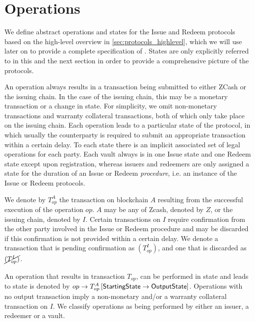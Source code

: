 \section{Operations}
\label{sec:ops}

We define abstract operations and states for the Issue and Redeem protocols based on the high-level overview in \cref{sec:protocols_highlevel}, which we will use later on to provide a complete specification of \zclaim.
States are only explicitly referred to in this and the next section in order to provide a comprehensive picture of the protocols.

An operation always results in a transaction being submitted to either ZCash or the issuing chain.
In the case of the issuing chain, this may be a monetary transaction or a change in state.
For simplicity, we omit non-monetary transactions and warranty collateral transactions, both of which only take place on the issuing chain.
Each operation leads to a particular state of the protocol, in which usually the counterparty is required to submit an appropriate transaction within a certain delay.
To each state there is an implicit associated set of legal operations for each party.
Each vault always is in one Issue state and one Redeem state except upon registration, whereas issuers and redeemers are only assigned a state for the duration of an Issue or Redeem \emph{procedure}, i.e. an instance of the Issue or Redeem protocols.

We denote by $T_{op}^{A}$ the transaction on blockchain $A$ resulting from the successful execution of the operation $op$.
$A$ may be any of Zcash, denoted by $Z$, or the issuing chain, denoted by $I$.
Certain transactions on $I$ require confirmation from the other party involved in the Issue or Redeem procedure and may be discarded if this confirmation is not provided within a certain delay. 
We denote a transaction that is pending confirmation as $(T_{op}^I)$, and one that is discarded as $\cancel{(T_{op}^I)}$.

\begin{sloppypar}
An operation that results in transaction $T_{op}$, can be performed in state \statess and leads to state \stateos is denoted by $op \rightarrow T_{op}^{A} \, [\mathsf{StartingState} \rightarrow \mathsf{OutputState}]$.
Operations with no output transaction imply a non-monetary and/or a warranty collateral transaction on $I$.
We classify operations as being performed by either an issuer, a redeemer or a vault.
\end{sloppypar}

